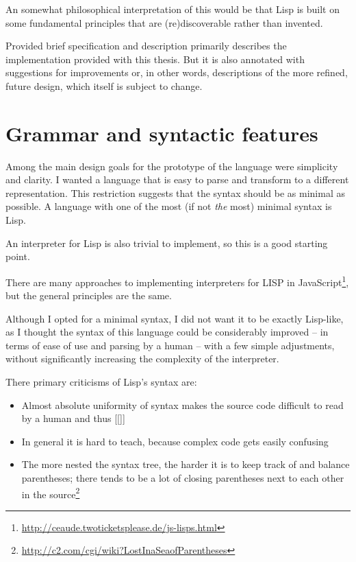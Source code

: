An somewhat philosophical interpretation of this would be that Lisp is built on
some fundamental principles that are (re)discoverable rather than invented.



Provided brief specification and description primarily describes the
implementation provided with this thesis. But it is also annotated with
suggestions for improvements or, in other words, descriptions of the more
refined, future design, which itself is subject to change.

\section{Grammar and syntactic features}
Among the main design goals for the prototype of the language were simplicity
and clarity. I wanted a language that is easy to parse and transform to a
different representation. This restriction suggests that the syntax should be as
minimal as possible. A language with one of the most (if not \textit{the} most)
minimal syntax is Lisp\cite{syntaxation}.

An interpreter for Lisp is also trivial to implement, so this is a good starting
point.

There are many approaches to implementing interpreters for LISP in
JavaScript\footnote{\url{http://ceaude.twoticketsplease.de/js-lisps.html}}, but
the general principles are the same.

Although I opted for a minimal syntax, I did not want it to be exactly
Lisp-like, as I thought the syntax of this language could be considerably
improved -- in terms of ease of use and parsing by a human -- with a few simple
adjustments, without significantly increasing the complexity of the interpreter.

There primary criticisms of Lisp's syntax are:
\begin{itemize}
    \item Almost absolute uniformity of syntax makes the source code difficult
      to read by a human and thus [[]]
    \item In general it is hard to teach\cite{wadler_critique}, because complex
      code gets easily confusing
    \item The more nested the syntax tree, the harder it is to keep track of and
      balance parentheses; there tends to be a lot of closing parentheses next
      to each other in the
      source\footnote{\url{http://c2.com/cgi/wiki?LostInaSeaofParentheses}}
\end{itemize}


